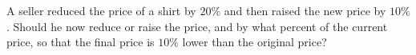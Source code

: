 A seller reduced the price of a shirt by $20\%$ and then raised the new price by $10\%$. Should he now reduce or raise the price, and by what percent of the current price, so that the final price is $10\%$ lower than the original price?
